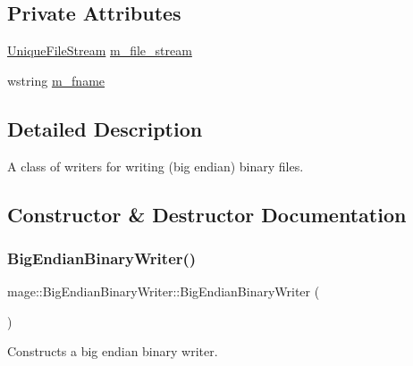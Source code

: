 \subsection*{Private Attributes}
\begin{DoxyCompactItemize}
\item 
\hyperlink{namespacemage_a0ee1bd45ad7dbb3dc8c8e1770e3538d4}{Unique\+File\+Stream} \hyperlink{classmage_1_1_big_endian_binary_writer_ad2cdbdca429d6c351a57b51d175ffb55}{m\+\_\+file\+\_\+stream}
\item 
wstring \hyperlink{classmage_1_1_big_endian_binary_writer_a5bf83b685bfce080f55458bdca2e698a}{m\+\_\+fname}
\end{DoxyCompactItemize}


\subsection{Detailed Description}
A class of writers for writing (big endian) binary files. 

\subsection{Constructor \& Destructor Documentation}
\hypertarget{classmage_1_1_big_endian_binary_writer_ac0917b684913834577d4850269a6c09a}{}\label{classmage_1_1_big_endian_binary_writer_ac0917b684913834577d4850269a6c09a} 
\subsubsection{\texorpdfstring{Big\+Endian\+Binary\+Writer()}{BigEndianBinaryWriter()}\hspace{0.1cm}{\footnotesize\ttfamily [1/3]}}
{\footnotesize\ttfamily mage\+::\+Big\+Endian\+Binary\+Writer\+::\+Big\+Endian\+Binary\+Writer (\begin{DoxyParamCaption}{ }\end{DoxyParamCaption})\hspace{0.3cm}{\ttfamily [protected]}}

Constructs a big endian binary writer. \hypertarget{classmage_1_1_big_endian_binary_writer_aafe65752342b2740e7293878ae469d9f}{}\label{classmage_1_1_big_endian_binary_writer_aafe65752342b2740e7293878ae469d9f} 
